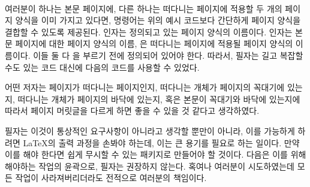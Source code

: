 \begin{syntax}
\cmd{\mergepagefloatstyle} \\
\end{syntax}
여러분이 하나는 본문 페이지에, 다른 하나는 떠다니는 페이지에 적용할 두 개의
페이지 양식을 이미 가지고 있다면, \cmd{\mergepagefloatstyle} 명령어는 위의
 예시 코드보다 간단하게 페이지 양식을
결합할 수 있도록 제공된다.
 인자는 정의되고 있는 페이지 양식의 이름이다.
 인자는 본문 페이지에 대한 페이지 양식의 이름,
은 떠다니는 페이지에 적용될 페이지 양식의 이름이다.
이들 둘 다 \cmd{\mergepagefloatstyle}을 부르기 전에 정의되어 있어야 한다.
따라서, 필자는 길고 복잡할 수도 있는 코드 대신에 다음의 코드를 사용할 수
있었다.
\begin{lcode}
\end{lcode}


어떤 저자는 페이지가 떠다니는 페이지인지, 떠다니는 개체가 페이지의 꼭대기에
있는지, 떠다니는 개체가 페이지의 바닥에 있는지, 혹은 본문이 꼭대기와 바닥에
있는지에 따라서 페이지 머릿글을 다르게 하면 좋을 수 있을 것 같다고 생각하였다.

필자는 이것이 통상적인 요구사항이 아니라고 생각할 뿐만이 아니라, 이를 가능하게
하려면 LaTeX의 출력 과정을 손봐야 하는데, 이는 큰 용기를 필요로 하는 일이다.
만약 이를 해야 한다면 쉽게 무시할 수 있는 패키지로 만들어야 할 것이다.
다음은 이를 위해 해야하는 작업의 윤곽으로, 필자는 권장하지 않는다.
혹여나 여러분이 시도하였는데 모든 작업이 사라져버리더라도 전적으로 여러분의
책임이다.

